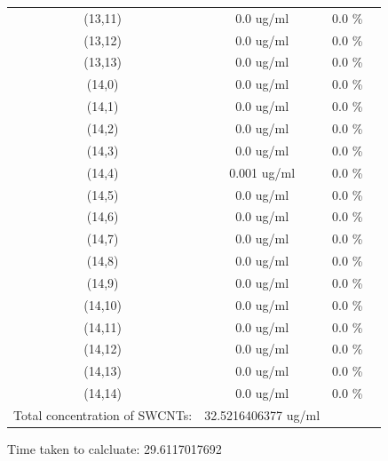 \documentclass{article}
\begin{document}
\begin{tabular}{c c c c}
(13,11)&        0.0 ug/ml        &0.0 \%\\
(13,12)&        0.0 ug/ml        &0.0 \%\\
(13,13)&        0.0 ug/ml        &0.0 \%\\
(14,0)&        0.0 ug/ml        &0.0 \%\\
(14,1)&        0.0 ug/ml        &0.0 \%\\
(14,2)&        0.0 ug/ml        &0.0 \%\\
(14,3)&        0.0 ug/ml        &0.0 \%\\
(14,4)&        0.001 ug/ml        &0.0 \%\\
(14,5)&        0.0 ug/ml        &0.0 \%\\
(14,6)&        0.0 ug/ml        &0.0 \%\\
(14,7)&        0.0 ug/ml        &0.0 \%\\
(14,8)&        0.0 ug/ml        &0.0 \%\\
(14,9)&        0.0 ug/ml        &0.0 \%\\
(14,10)&        0.0 ug/ml        &0.0 \%\\
(14,11)&        0.0 ug/ml        &0.0 \%\\
(14,12)&        0.0 ug/ml        &0.0 \%\\
(14,13)&        0.0 ug/ml        &0.0 \%\\
(14,14)&        0.0 ug/ml        &0.0 \%\\
Total concentration of SWCNTs: &32.5216406377 ug/ml\\

\end{tabular}Time taken to calcluate: 29.6117017692
\end{document}
